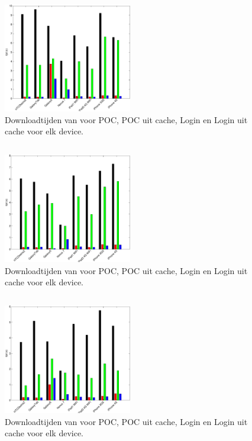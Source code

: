 \subsection{\kendo}

\begin{figure}
  \centering
  \includegraphics[width=0.5\textwidth]{figuren/performance-kendo.pdf}
  \caption{Downloadtijden van \kendo{} voor POC,  POC uit cache,  Login en Login uit cache voor elk device.}
  \label{fig:performantie-kendo}
\end{figure}

\subsection{\jqm}

\begin{figure}
  \centering
  \includegraphics[width=0.5\textwidth]{figuren/performance-jquery.pdf}
  \caption{Downloadtijden van \jqm{} voor POC,  POC uit cache,  Login en Login uit cache voor elk device.}
  \label{fig:performantie-jqm}
\end{figure}

\subsection{\lungo}

\begin{figure}
  \centering
  \includegraphics[width=0.5\textwidth]{figuren/performance-lungo.pdf}
  \caption{Downloadtijden van \lungo{} voor POC,  POC uit cache,  Login en Login uit cache voor elk device.}
  \label{fig:performantie-lungo}
\end{figure}